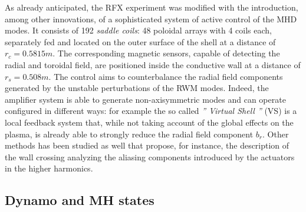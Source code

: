 As already anticipated, the RFX experiment was modified with the introduction, among other innovations, of a sophisticated system of active control of the MHD modes. It consists of 192 \textit{saddle coils}: 48 poloidal arrays with 4 coils each, separately fed and located on the outer surface of the shell at a distance of $r_c = 0.5815m$. The corresponding magnetic sensors, capable of detecting the radial and toroidal field, are positioned inside the conductive wall at a distance of $r_s = 0.508m$. The control aims to counterbalance the radial field components generated by the unstable perturbations of the RWM modes. Indeed, the amplifier system is able to generate non-axisymmetric modes and can operate configured in different ways: for example the so called \emph{'' Virtual Shell ''} (VS) is a local feedback system that, while not taking account of the global effects on the plasma, is already able to strongly reduce the radial field component $b_r$\cite{pizz78}\cite{pizz79}. Other methods has been studied as well that propose, for instance, the description of the wall crossing analyzing the aliasing components introduced by the actuators in the higher harmonics\cite{pizz81}.




\subsection{Dynamo and MH states}

